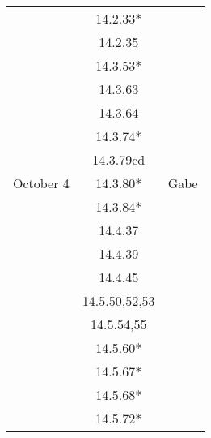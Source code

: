\documentclass[12pt]{amsart}
\begin{document}
\begin{longtable}{c|c|l}
                        & 14.2.33*                             &                                          \\
                        & 14.2.35                              &                                          \\
                        & 14.3.53*                             &                                          \\
                        & 14.3.63                              &                                          \\
                        & 14.3.64                              &                                          \\
                        & 14.3.74*                             &                                          \\
                        & 14.3.79cd                            &                                          \\
        October 4       & 14.3.80*                             & Gabe                                     \\
                        & 14.3.84*                             &                                          \\
                        & 14.4.37                              &                                          \\
                        & 14.4.39                              &                                          \\
                        & 14.4.45                              &                                          \\
                        & 14.5.50,52,53                        &                                          \\
                        & 14.5.54,55                           &                                          \\
                        & 14.5.60*                             &                                          \\
                        & 14.5.67*                             &                                          \\
                        & 14.5.68*                             &                                          \\
                        & 14.5.72*                             &                                         
    \end{longtable}
\end{document}
